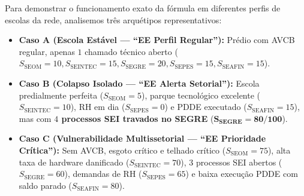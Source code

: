 \documentclass[9pt,a4paper]{extarticle}
\begin{document}
Para demonstrar o funcionamento exato da fórmula em diferentes perfis de escolas da rede, analisemos três arquétipos representativos:
\begin{itemize}[leftmargin=1.5em, itemsep=2pt]
    \item \textbf{Caso A (Escola Estável --- ``EE Perfil Regular''):} Prédio com AVCB regular, apenas $1$ chamado técnico aberto ($S_{\text{SEOM}}=10, S_{\text{SEINTEC}}=15, S_{\text{SEGRE}}=20, S_{\text{SEPES}}=15, S_{\text{SEAFIN}}=15$).
    \item \textbf{Caso B (Colapso Isolado --- ``EE Alerta Setorial''):} Escola predialmente perfeita ($S_{\text{SEOM}}=5$), parque tecnológico excelente ($S_{\text{SEINTEC}}=10$), RH em dia ($S_{\text{SEPES}}=0$) e PDDE executado ($S_{\text{SEAFIN}}=15$), mas com \textbf{$4$ processos SEI travados no SEGRE} ($\mathbf{S_{\text{SEGRE}} = 80/100}$).
    \item \textbf{Caso C (Vulnerabilidade Multissetorial --- ``EE Prioridade Crítica''):} Sem AVCB, esgoto crítico e telhado crítico ($S_{\text{SEOM}}=75$), alta taxa de hardware danificado ($S_{\text{SEINTEC}}=70$), $3$ processos SEI abertos ($S_{\text{SEGRE}}=60$), demandas de RH ($S_{\text{SEPES}}=65$) e baixa execução PDDE com saldo parado ($S_{\text{SEAFIN}}=80$).
\end{itemize}
\end{document}
